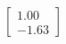 \documentclass[preview]{standalone}
\begin{document}
\begin{align*}
\begin{bmatrix} 1.00 \\ -1.63 \end{bmatrix}
\end{align*}
\end{document}
